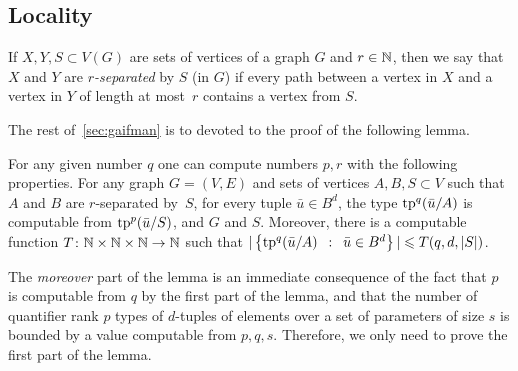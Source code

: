 \subsection{Locality}
If $X,Y,S\subset V(G)$ are sets of vertices of a graph $G$ 
and $r\in \mathbb{N}$, then we say that $X$ and $Y$ are  \emph{$r$-separated}
by $S$  (in $G$) if every path between a vertex in $X$ and a vertex in 
$Y$ of length at most~$r$ contains a vertex from $S$.


The rest of~\cref{sec:gaifman} is to devoted to the proof of the following  lemma.




\begin{lemma}%
	\label{lem:types}
For any given number $q$
one can compute numbers $p,r$ with the following properties.	For any graph $G=(V,E)$ and sets of vertices $A,B,S\subset V$	
	such that $A$  and $B$ are $r$-separated by~$S$,
	for every tuple $\bar u\in B^{d}$, 
	the type $\mathrm{tp}^q(\bar u/A)$
	is computable from  $\mathrm{tp}^{p}(\bar u/S)$, and $G$ and $S$.
  Moreover, there is a computable function $T\colon \mathbb{N}\times\mathbb{N}\times\mathbb{N}\to\mathbb{N}$
  such that $|\left\{\mathrm{tp}^{q}(\bar u/A) \,~:~\, \bar u\in B^d \right\}|\leqslant T(q,d,|S|)$.
  
  
\end{lemma}

The \emph{moreover} part of the lemma is an immediate consequence of the fact that $p$
is computable from $q$ by the first part of the lemma,
and that the number of quantifier rank $p$ types of $d$-tuples of elements over a set of parameters of  size $s$ is bounded by a value computable from $p,q,s$. Therefore, we only need to prove the first part of the lemma.


